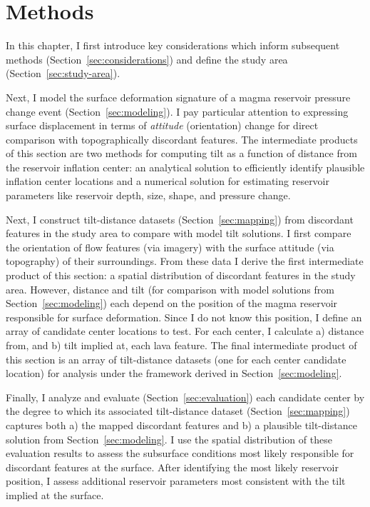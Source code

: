 \chapter{Methods}\label{cha:methods}

In this chapter, I first introduce key considerations which inform subsequent methods (Section~\ref{sec:considerations}) and define the study area (Section~\ref{sec:study-area}).

Next, I model the surface deformation signature of a magma reservoir pressure change event (Section~\ref{sec:modeling}). I pay particular attention to expressing surface displacement in terms of \emph{attitude} (orientation) change for direct comparison with topographically discordant features. The intermediate products of this section are two methods for computing tilt as a function of distance from the reservoir inflation center: an analytical solution to efficiently identify plausible inflation center locations and a numerical solution for estimating reservoir parameters like reservoir depth, size, shape, and pressure change.

Next, I construct tilt-distance datasets (Section~\ref{sec:mapping}) from discordant features in the study area to compare with model tilt solutions. I first compare the orientation of flow features (via imagery) with the surface attitude (via topography) of their surroundings. From these data I derive the first intermediate product of this section: a spatial distribution of discordant features in the study area. However, distance and tilt (for comparison with model solutions from Section~\ref{sec:modeling}) each depend on the position of the magma reservoir responsible for surface deformation. Since I do not know this position, I define an array of candidate center locations to test. For each center, I calculate a) distance from, and b) tilt implied at, each lava feature. The final intermediate product of this section is an array of tilt-distance datasets (one for each center candidate location) for analysis under the framework derived in Section~\ref{sec:modeling}.

Finally, I analyze and evaluate (Section~\ref{sec:evaluation}) each candidate center by the degree to which its associated tilt-distance dataset (Section~\ref{sec:mapping}) captures both a) the mapped discordant features and b) a plausible tilt-distance solution from Section~\ref{sec:modeling}. I use the spatial distribution of these evaluation results to assess the subsurface conditions most likely responsible for discordant features at the surface. After identifying the most likely reservoir position, I assess additional reservoir parameters most consistent with the tilt implied at the surface.

